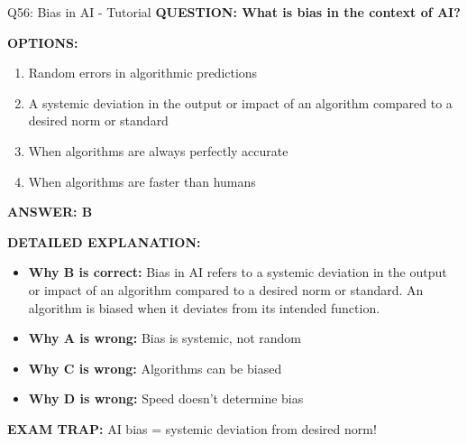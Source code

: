 \documentclass[8pt]{beamer}
\begin{document}
	\begin{frame}{Q56: Bias in AI - Tutorial}
		\fontsize{6.5}{7.5}\selectfont
		\textbf{QUESTION: What is bias in the context of AI?}
		
		\vspace{0.1cm}
		\textbf{OPTIONS:}
		\begin{enumerate}
			\item Random errors in algorithmic predictions
			\item A systemic deviation in the output or impact of an algorithm compared to a desired norm or standard
			\item When algorithms are always perfectly accurate
			\item When algorithms are faster than humans
		\end{enumerate}
		
		\vspace{0.1cm}
		\textcolor{myblue}{\textbf{ANSWER: B}}
		
		\vspace{0.1cm}
		\textbf{DETAILED EXPLANATION:}
		\begin{itemize}
			\item \textbf{Why B is correct:} Bias in AI refers to a systemic deviation in the output or impact of an algorithm compared to a desired norm or standard. An algorithm is biased when it deviates from its intended function.
			\item \textbf{Why A is wrong:} Bias is systemic, not random
			\item \textbf{Why C is wrong:} Algorithms can be biased
			\item \textbf{Why D is wrong:} Speed doesn't determine bias
		\end{itemize}
		
		\textcolor{myred}{\textbf{EXAM TRAP:}} AI bias = \textcolor{myblue}{systemic deviation from desired norm}!
	\end{frame}
	
\end{document}
